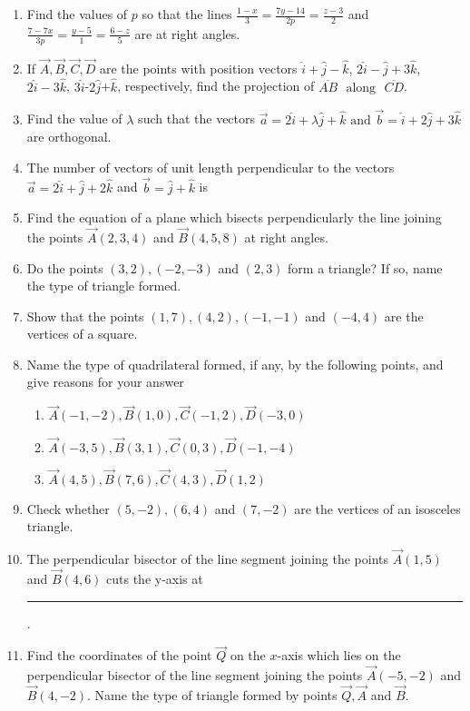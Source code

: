 \begin{enumerate}[label=\thesubsection.\arabic*, ref=\thesubsection.\theenumi]
\item Find the values of $p$ so that the lines $ \frac{1-x}{3}=\frac{7y-14}{2p}=\frac{z-3}{2}$ and $ \frac{7-7x}{3p}=\frac{y-5}{1}=\frac{6-z}{5}$ are at right angles.
\item If $\vec{A}, \vec{B}, \vec{C}, \vec{D}$  are the points with position vectors $\hat{i}+\hat{j}-\hat{k}$,  $2\hat{i}-\hat{j}+3\hat{k}$,  $2\hat{i}-3\hat{k}$,  $3\hat{i}$-$2\hat{j}$+$\hat{k}$,  respectively,  find the projection of $\overline{AB}$ $\text{ along }$ $\overline{CD}$.
\item Find the value of $\lambda$ such that the vectors $\vec{a}=2\hat{i}+\lambda\hat{j}+\hat{k}$ $\text{and}$ $\vec{b}=\hat{i}+2\hat{j}+3\hat{k}$ are orthogonal.
\item The number of vectors of unit length perpendicular to the vectors $\vec{a}=2\hat{i}+\hat{j}+2\hat{k}$  and  $\vec{b}=\hat{j}+\hat{k}$ is
\item Find the equation of a plane which  bisects perpendicularly the line joining the points $\vec{A}(2, 3, 4)$ and $\vec{B}(4, 5, 8)$ at right angles.
\item Do the points $(3,2), (-2,-3)$ and $(2,3)$ form a triangle? If so, name the type of triangle formed.
\item Show that the points $(1,7),(4,2),(-1,-1)$ and $(-4,4)$ are the vertices of a square.
\item Name the type of quadrilateral formed,  if any,  by the following points, and give reasons for your answer
\begin{enumerate}
\item $\vec{A}(-1, -2),  \vec{B}(1, 0),  \vec{C}(-1, 2),  \vec{D}(-3, 0)$
\item $\vec{A}(-3, 5),  \vec{B}(3, 1),  \vec{C}(0, 3),  \vec{D}(-1, -4)$
\item $\vec{A}(4, 5),  \vec{B}(7, 6),  \vec{C}(4, 3),  \vec{D}(1, 2)$
\end{enumerate}
\solution
		
\item Check whether $(5, -2),  (6, 4)$ and $(7, -2)$ are the vertices of an isosceles triangle.
\item The perpendicular bisector of the line segment joining the points $\vec{A} (1,  5) $ and $
\vec{B} (4,  6)$ cuts the y-axis at \rule{1cm}{0.1pt}.
\item Find the coordinates of the point $\vec{Q}$ on the $x$-axis which lies on the perpendicular bisector of the line segment joining the points $\vec{A}(-5, -2) $ and $ \vec{B}(4, -2)$. Name the type of triangle formed by points $\vec{Q}, \vec{A}$ and $\vec{B}$.

\end{enumerate}
